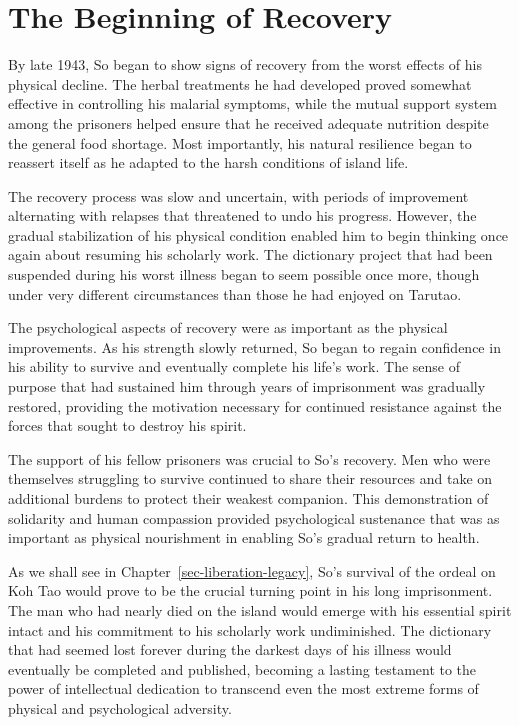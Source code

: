\documentclass[
  Letterpaper,
]{scrbook}
\begin{document}
\section{The Beginning of Recovery}\label{the-beginning-of-recovery}

By late 1943, So began to show signs of recovery from the worst effects
of his physical decline. The herbal treatments he had developed proved
somewhat effective in controlling his malarial symptoms, while the
mutual support system among the prisoners helped ensure that he received
adequate nutrition despite the general food shortage. Most importantly,
his natural resilience began to reassert itself as he adapted to the
harsh conditions of island life.

The recovery process was slow and uncertain, with periods of improvement
alternating with relapses that threatened to undo his progress. However,
the gradual stabilization of his physical condition enabled him to begin
thinking once again about resuming his scholarly work. The dictionary
project that had been suspended during his worst illness began to seem
possible once more, though under very different circumstances than those
he had enjoyed on Tarutao.

The psychological aspects of recovery were as important as the physical
improvements. As his strength slowly returned, So began to regain
confidence in his ability to survive and eventually complete his life's
work. The sense of purpose that had sustained him through years of
imprisonment was gradually restored, providing the motivation necessary
for continued resistance against the forces that sought to destroy his
spirit.

The support of his fellow prisoners was crucial to So's recovery. Men
who were themselves struggling to survive continued to share their
resources and take on additional burdens to protect their weakest
companion. This demonstration of solidarity and human compassion
provided psychological sustenance that was as important as physical
nourishment in enabling So's gradual return to health.

As we shall see in Chapter~\ref{sec-liberation-legacy}, So's survival of
the ordeal on Koh Tao would prove to be the crucial turning point in his
long imprisonment. The man who had nearly died on the island would
emerge with his essential spirit intact and his commitment to his
scholarly work undiminished. The dictionary that had seemed lost forever
during the darkest days of his illness would eventually be completed and
published, becoming a lasting testament to the power of intellectual
dedication to transcend even the most extreme forms of physical and
psychological adversity.
\end{document}
